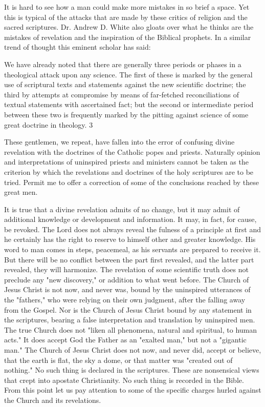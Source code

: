 It is hard to see how a man could make more mistakes in so brief a space. Yet this is typical
of the attacks that are made by these critics of religion and the sacred scriptures. Dr. Andrew
D. White also gloats over what he thinks are the mistakes of revelation and the inspiration of
the Biblical prophets. In a similar trend of thought this eminent scholar has said:

We have already noted that there are generally three periods or phases in a theological attack
upon any science. The first of these is marked by the general use of scriptural texts and
statements against the new scientific doctrine; the third by attempts at compromise by means
of far-fetched reconciliations of textual statements with ascertained fact; but the second or
intermediate period between these two is frequently marked by the pitting against science of
some great doctrine in theology. 3

These gentlemen, we repeat, have fallen into the error of confusing divine revelation with the
doctrines of the Catholic popes and priests. Naturally opinion and interpretations of
uninspired priests and ministers cannot be taken as the criterion by which the revelations and
doctrines of the holy scriptures are to be tried. Permit me to offer a correction of some of the
conclusions reached by these great men.

It is true that a divine revelation admits of no change, but it may admit of additional
knowledge or development and information. It may, in fact, for cause, be revoked. The Lord
does not always reveal the fulness of a principle at first and he certainly has the right to
reserve to himself other and greater knowledge. His word to man comes in steps, peacemeal,
as his servants are prepared to receive it. But there will be no conflict between the part first
revealed, and the latter part revealed, they will harmonize. The revelation of some scientific
truth does not preclude any "new discovery," or addition to what went before. The Church of
Jesus Christ is not now, and never was, bound by the uninspired utterances of the "fathers,"
who were relying on their own judgment, after the falling away from the Gospel. Nor is the
Church of Jesus Christ bound by any statement in the scriptures, bearing a false interpretation
and translation by uninspired men. The true Church does not "liken all phenomena, natural
and spiritual, to human acts." It does accept God the Father as an "exalted man," but not a
"gigantic man." The Church of Jesus Christ does not now, and never did, accept or believe,
that the earth is flat, the sky a dome, or that matter was "created out of nothing." No such
thing is declared in the scriptures. These are nonsensical views that crept into apostate
Christianity. No such thing is recorded in the Bible. From this point let us pay attention to
some of the specific charges hurled against the Church and its revelations.

